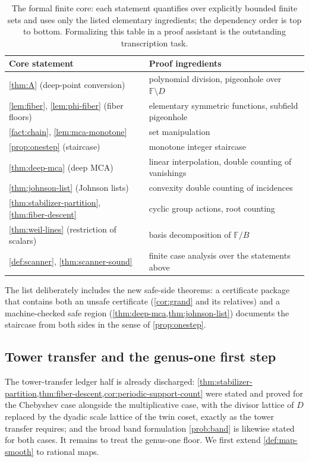 \documentclass[11pt]{article}
\theoremstyle{definition}
\theoremstyle{remark}
\newcommand{\F}{\mathbb{F}}
\newcommand{\B}{B}
\begin{document}
\begin{table}[ht]
\centering
\small
\begin{tabular}{@{}ll@{}}
\toprule
Core statement & Proof ingredients \\
\midrule
\cref{thm:A} (deep-point conversion) & polynomial division, pigeonhole over $\F\setminus D$ \\
\cref{lem:fiber}, \cref{lem:phi-fiber} (fiber floors) & elementary symmetric functions, subfield pigeonhole \\
\cref{fact:chain}, \cref{lem:mca-monotone} & set manipulation \\
\cref{prop:onestep} (staircase) & monotone integer staircase \\
\cref{thm:deep-mca} (deep MCA) & linear interpolation, double counting of vanishings \\
\cref{thm:johnson-list} (Johnson lists) & convexity double counting of incidences \\
\cref{thm:stabilizer-partition}, \cref{thm:fiber-descent} & cyclic group actions, root counting \\
\cref{thm:weil-lines} (restriction of scalars) & basis decomposition of $\F/\B$ \\
\cref{def:scanner}, \cref{thm:scanner-sound} & finite case analysis over the statements above \\
\bottomrule
\end{tabular}
\caption{The formal finite core: each statement quantifies over explicitly bounded finite sets and uses only the listed elementary ingredients; the dependency order is top to bottom. Formalizing this table in a proof assistant is the outstanding transcription task.}
\label{tab:core}
\end{table}

The list deliberately includes the new safe-side theorems: a certificate package that contains both an unsafe certificate \textup(\cref{cor:grand} and its relatives\textup) and a machine-checked safe region \textup(\cref{thm:deep-mca,thm:johnson-list}\textup) documents the staircase from both sides in the sense of \cref{prop:onestep}.

\subsection{Tower transfer and the genus-one first step}\label{sec:discharge-T8}

The tower-transfer ledger half is already discharged: \cref{thm:stabilizer-partition,thm:fiber-descent,cor:periodic-support-count} were stated and proved for the Chebyshev case alongside the multiplicative case, with the divisor lattice of $D$ replaced by the dyadic scale lattice of the twin coset, exactly as the tower transfer requires; and the broad band formulation \cref{prob:band} is likewise stated for both cases. It remains to treat the genus-one floor. We first extend \cref{def:map-smooth} to rational maps.
\end{document}
